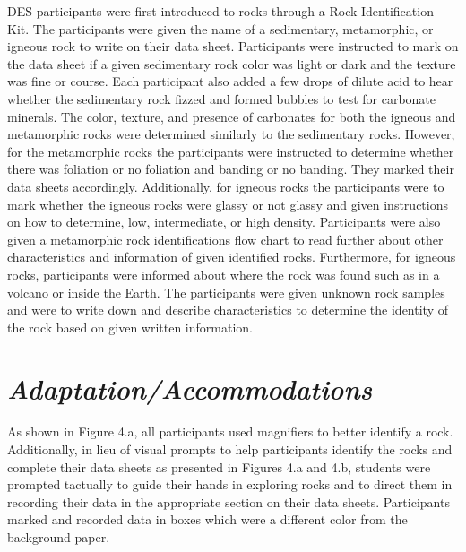 \documentclass[11pt]{sig-alternate}
\begin{document}
\begin{large}
DES participants were first introduced to rocks through a Rock Identification Kit. The participants were given the name of a sedimentary, metamorphic, or igneous rock to write on their data sheet.  Participants were instructed to mark on the data sheet if a given sedimentary rock color was light or dark and the texture was fine or course.  Each participant also added a few drops of dilute acid to hear whether the sedimentary rock fizzed and formed bubbles to test for carbonate minerals. The color, texture, and presence of carbonates for both the igneous and metamorphic rocks were determined similarly to the sedimentary rocks. However, for the metamorphic rocks the participants were instructed to determine whether there was foliation or no foliation and banding or no banding. They marked their data sheets accordingly.  Additionally, for igneous rocks the participants were to mark whether the igneous rocks were glassy or not glassy and given instructions on how to determine, low, intermediate, or high density. Participants were also given a metamorphic rock identifications flow chart to read further about other characteristics and information of given identified rocks. Furthermore, for igneous rocks, participants were informed about where the rock was found such as in a volcano or inside the Earth. The participants were given unknown rock samples and were to write down and describe characteristics to determine the identity of the rock based on given written information.  

\section*{\textit{Adaptation/Accommodations}}
  
As shown in Figure 4.a, all participants used magnifiers to better identify a rock.  Additionally, in lieu of visual prompts to help participants identify the rocks and complete their data sheets as presented in Figures 4.a and 4.b, students were prompted tactually to guide their hands in exploring rocks and to direct them in recording their data in the appropriate section on their data sheets. Participants marked and recorded data in boxes which were a different color from the background paper.


\end{large}
\end{document}
